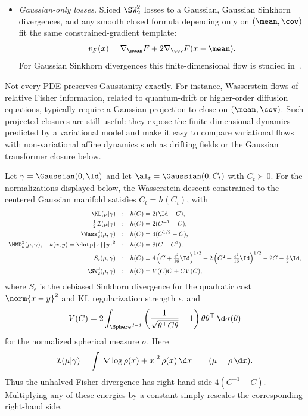 \begin{example}
\begin{itemize}
		\item \emph{Gaussian-only losses.} Sliced $\SW_2^2$ losses to a Gaussian, Gaussian Sinkhorn divergences, and any smooth closed formula depending only on $(\mean,\cov)$ fit the same constrained-gradient template:
			\[
				v_F(x)=\nabla_\mean F+2\nabla_\cov F(x-\mean).
			\]
		For Gaussian Sinkhorn divergences this finite-dimensional flow is studied in~\cite{HardionLacombe2026GaussianSinkhornFlow}.
	\end{itemize}

	Not every PDE preserves Gaussianity exactly. For instance, Wasserstein flows of relative Fisher information, related to quantum-drift or higher-order diffusion equations, typically require a Gaussian projection to close on $(\mean,\cov)$. Such projected closures are still useful: they expose the finite-dimensional dynamics predicted by a variational model and make it easy to compare variational flows with non-variational affine dynamics such as drifting fields or the Gaussian transformer closure below.
\end{example}

\begin{prop}\label{prop-centered-gaussian-covariance-catalogue}
	Let $\gamma=\Gaussian(0,\Id)$ and let $\al_t=\Gaussian(0,C_t)$ with $C_t\succ0$. For the normalizations displayed below, the Wasserstein descent constrained to the centered Gaussian manifold satisfies $\dot C_t=h(C_t)$, with
	\[
	\begin{array}{rcl}
		\KL(\mu|\gamma) &:& h(C)=2(\Id-C), \\[.35em]
		\frac12\,\mathcal I(\mu|\gamma) &:& h(C)=2(C^{-1}-C), \\[.35em]
		\Wass_2^2(\mu,\gamma) &:& h(C)=4(C^{1/2}-C), \\[.35em]
		\MMD_k^2(\mu,\gamma),\quad k(x,y)=\dotp{x}{y}^2
			&:& h(C)=8(C-C^2), \\[.35em]
		S_\epsilon(\mu,\gamma)
			&:& h(C)=
			4\left(C+\frac{\epsilon^2}{16}\Id\right)^{1/2}
			-2\left(C^2+\frac{\epsilon^2}{16}\Id\right)^{1/2}
			-2C-\frac{\epsilon}{2}\Id, \\[.75em]
		\SW_2^2(\mu,\gamma)
			&:& h(C)=V(C)C+CV(C),
	\end{array}
	\]
	where $S_\epsilon$ is the debiased Sinkhorn divergence for the quadratic cost $\norm{x-y}^2$ and KL regularization strength $\epsilon$, and
	\[
		V(C)=
		2\int_{\Sphere^{d-1}}
		\left(\frac{1}{\sqrt{\theta^\top C\theta}}-1\right)
		\theta\theta^\top \,\d\sigma(\theta)
	\]
	for the normalized spherical measure $\sigma$. Here
	\[
		\mathcal I(\mu|\gamma)=\int \left|\nabla\log\rho(x)+x\right|^2\rho(x)\,\d x
		\qquad(\mu=\rho\,\d x).
	\]
	Thus the unhalved Fisher divergence has right-hand side $4(C^{-1}-C)$. Multiplying any of these energies by a constant simply rescales the corresponding right-hand side.
\end{prop}

